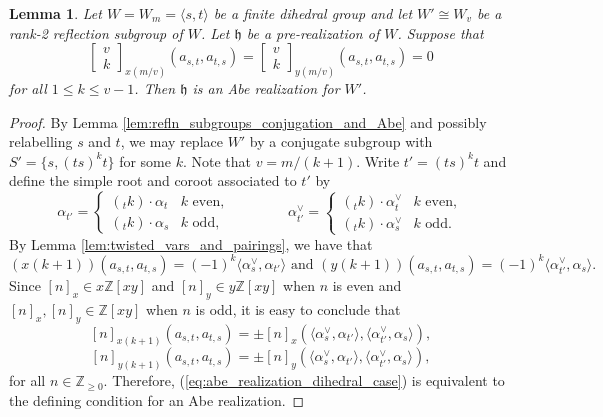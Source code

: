 \documentclass{amsart}
\newcommand{\Z}{\mathbb{Z}}
\newcommand{\fr}[1]{\mathfrak{#1}}
\renewcommand{\binom}[2]{\begin{bmatrix} #1 \\ #2 \end{bmatrix}}
\newtheorem{lemma}[subsubsection]{Lemma}
\theoremstyle{definition}
\numberwithin{equation}{subsection}
\begin{document}
\begin{lemma}\label{lem:abe_realization_dihedral_case}
    Let $W = W_m = \langle s,t \rangle$ be a finite dihedral group and let $W' \cong W_v$ be a rank-2 reflection subgroup of $W$.
    Let $\fr{h}$ be a pre-realization of $W$.
    Suppose that 
    \begin{equation}\label{eq:abe_realization_dihedral_case}
        \binom{v}{k}_{x(m/v)} (a_{s,t}, a_{t,s}) = \binom{v}{k}_{y(m/v)} (a_{s,t}, a_{t,s}) = 0
    \end{equation}
     for all $1 \leq k \leq v-1$. Then $\fr{h}$ is an Abe realization for $W'$.
\end{lemma}
\begin{proof}
    By Lemma \ref{lem:refln_subgroups_conjugation_and_Abe} and possibly relabelling $s$ and $t$, we may replace $W'$ by a conjugate subgroup with $S' = \{ s, (ts)^k t\}$ for some $k$.
    Note that $v = m/(k+1)$. Write $t' = (ts)^k t$ and define the simple root and coroot associated to $t'$ by 
    \[\alpha_{t'} = \begin{cases} ({}_t k) \cdot \alpha_t & k \text{ even}, \\ ({}_t k) \cdot \alpha_s & k \text{ odd}, \end{cases} \qquad\qquad \alpha_{t'}^{\vee} = \begin{cases} ({}_t k) \cdot \alpha_t^{\vee} & k \text{ even}, \\ ({}_t k) \cdot \alpha_s^{\vee} & k \text{ odd}. \end{cases}\] 
   By Lemma \ref{lem:twisted_vars_and_pairings}, we have that
    \[(x (k+1)) (a_{s,t}, a_{t,s}) = (-1)^k \langle \alpha_s^{\vee}, \alpha_{t'} \rangle \text{ and } (y (k+1)) (a_{s,t}, a_{t,s}) = (-1)^k \langle \alpha_{t'}^{\vee}, \alpha_s \rangle.\]
    Since $[n]_x \in x\Z[xy]$ and $[n]_y \in y\Z[xy]$ when $n$ is even and $[n]_x, [n]_y \in \Z[xy]$ when $n$ is odd, it is easy to conclude that
    \[ [n]_{x(k+1)} (a_{s,t}, a_{t,s}) = \pm [n]_x (\langle \alpha_s^{\vee}, \alpha_{t'} \rangle, \langle \alpha_{t'}^{\vee}, \alpha_s \rangle),\] 
    \[ [n]_{y(k+1)} (a_{s,t}, a_{t,s}) = \pm [n]_y (\langle \alpha_s^{\vee}, \alpha_{t'} \rangle, \langle \alpha_{t'}^{\vee}, \alpha_s \rangle), \]
    for all $n \in \Z_{\geq 0}$.
    Therefore, (\ref{eq:abe_realization_dihedral_case}) is equivalent to the defining condition for an Abe realization. 
\end{proof}
\end{document}
